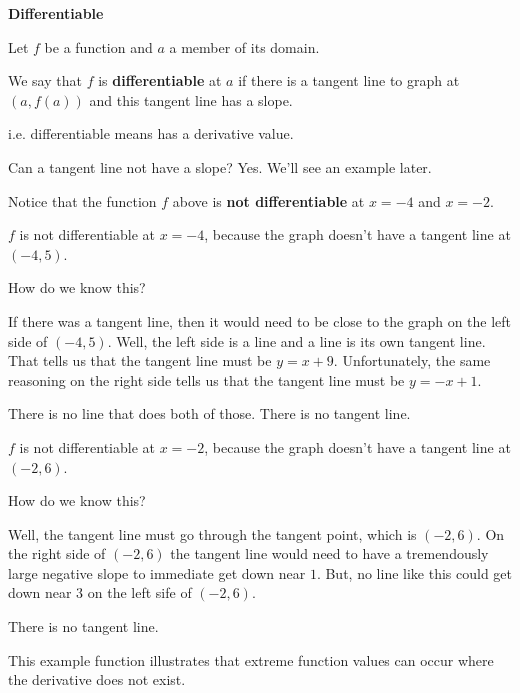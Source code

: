\documentclass{ximera}
\begin{document}
\begin{definition} \textbf{\textcolor{green!50!black}{Differentiable}}

Let $f$ be a function and $a$ a member of its domain.

We say that $f$ is \textbf{differentiable} at $a$ if there is a tangent line to graph at $(a, f(a))$ and this tangent line has a slope.


i.e. differentiable means has a derivative value.

\end{definition}
Can a tangent line not have a slope?  Yes. We'll see an example later. 






Notice that the function $f$ above is \textbf{not differentiable} at  $x=-4$ and  $x=-2$. 




\begin{idea}

$f$ is not differentiable at $x=-4$, because the graph doesn't have a tangent line at $(-4, 5)$. 

How do we know this? 


If there was a tangent line, then it would need to be close to the graph on the left side of $(-4, 5)$. Well, the left side is a line and a line is its own tangent line.  That tells us that the tangent line must be $y = x + 9$.  Unfortunately, the same reasoning on the right side tells us that the tangent line must be $y = -x +1$. 

There is no line that does both of those.  There is no tangent line. 



$f$ is not differentiable at $x=-2$, because the graph doesn't have a tangent line at $(-2, 6)$. 

How do we know this? 

Well, the tangent line must go through the tangent point, which is $(-2, 6)$.  On the right side of $(-2, 6)$ the tangent line would need to have a tremendously large negative slope to immediate get down near $1$.  But, no line like this could get down near $3$ on the left sife of $(-2, 6)$.

There is no tangent line. 



\end{idea}


This example function illustrates that extreme function values can occur where the derivative does not exist. 
\end{document}
